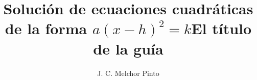 \documentclass[12pt,addpoints,answers]{guia}
\title{Solución de ecuaciones cuadráticas de la forma $a(x-h)^2=k$}
\title{El título de la guía}
\author{J. C. Melchor Pinto}
\begin{document}
\pagestyle{headandfoot}

\INFO
\begin{questions}
    
    \newpage
    
\end{questions}

\end{document}
